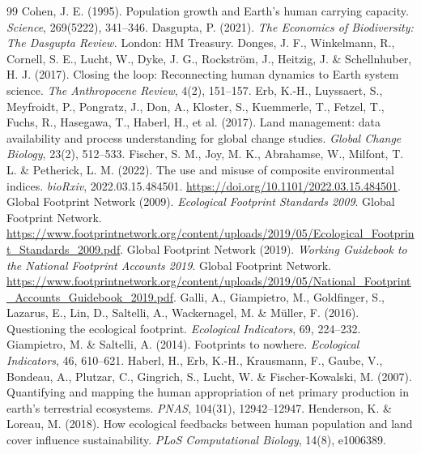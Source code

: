 \begin{thebibliography}{99}
 Cohen, J. E. (1995). Population growth and Earth's human carrying capacity. \emph{Science}, 269(5222), 341--346.
 Dasgupta, P. (2021). \emph{The Economics of Biodiversity: The Dasgupta Review.} London: HM Treasury.
 Donges, J. F., Winkelmann, R., Cornell, S. E., Lucht, W., Dyke, J. G., Rockstr\"om, J., Heitzig, J. \& Schellnhuber, H. J. (2017). Closing the loop: Reconnecting human dynamics to Earth system science. \emph{The Anthropocene Review}, 4(2), 151--157.
 Erb, K.-H., Luyssaert, S., Meyfroidt, P., Pongratz, J., Don, A., Kloster, S., Kuemmerle, T., Fetzel, T., Fuchs, R., Hasegawa, T., Haberl, H., et al. (2017). Land management: data availability and process understanding for global change studies. \emph{Global Change Biology}, 23(2), 512--533.
 Fischer, S. M., Joy, M. K., Abrahamse, W., Milfont, T. L. \& Petherick, L. M. (2022). The use and misuse of composite environmental indices. \emph{bioRxiv}, 2022.03.15.484501. \url{https://doi.org/10.1101/2022.03.15.484501}.
 Global Footprint Network (2009). \emph{Ecological Footprint Standards 2009}. Global Footprint Network. \url{https://www.footprintnetwork.org/content/uploads/2019/05/Ecological_Footprint_Standards_2009.pdf}.
 Global Footprint Network (2019). \emph{Working Guidebook to the National Footprint Accounts 2019}. Global Footprint Network. \url{https://www.footprintnetwork.org/content/uploads/2019/05/National_Footprint_Accounts_Guidebook_2019.pdf}.
 Galli, A., Giampietro, M., Goldfinger, S., Lazarus, E., Lin, D., Saltelli, A., Wackernagel, M. \& M\"uller, F. (2016). Questioning the ecological footprint. \emph{Ecological Indicators}, 69, 224--232.
 Giampietro, M. \& Saltelli, A. (2014). Footprints to nowhere. \emph{Ecological Indicators}, 46, 610--621.
 Haberl, H., Erb, K.-H., Krausmann, F., Gaube, V., Bondeau, A., Plutzar, C., Gingrich, S., Lucht, W. \& Fischer-Kowalski, M. (2007). Quantifying and mapping the human appropriation of net primary production in earth's terrestrial ecosystems. \emph{PNAS}, 104(31), 12942--12947.
 Henderson, K. \& Loreau, M. (2018). How ecological feedbacks between human population and land cover influence sustainability. \emph{PLoS Computational Biology}, 14(8), e1006389.

\end{thebibliography}
